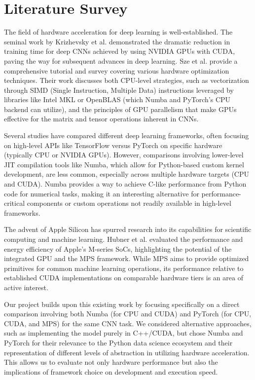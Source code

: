 \documentclass[conference]{IEEEtran} %
\begin{document}
\section{Literature Survey}
\label{sec:literature}
The field of hardware acceleration for deep learning is well-established. The seminal work by Krizhevsky et al. \cite{Krizhevsky2012} demonstrated the dramatic reduction in training time for deep CNNs achieved by using NVIDIA GPUs with CUDA, paving the way for subsequent advances in deep learning. Sze et al. \cite{Sze2017} provide a comprehensive tutorial and survey covering various hardware optimization techniques. Their work discusses both CPU-level strategies, such as vectorization through SIMD (Single Instruction, Multiple Data) instructions leveraged by libraries like Intel MKL or OpenBLAS (which Numba and PyTorch's CPU backend can utilize), and the principles of GPU parallelism that make GPUs effective for the matrix and tensor operations inherent in CNNs.

Several studies have compared different deep learning frameworks, often focusing on high-level APIs like TensorFlow versus PyTorch on specific hardware (typically CPU or NVIDIA GPUs). However, comparisons involving lower-level JIT compilation tools like Numba, which allow for Python-based custom kernel development, are less common, especially across multiple hardware targets (CPU and CUDA). Numba provides a way to achieve C-like performance from Python code for numerical tasks, making it an interesting alternative for performance-critical components or custom operations not readily available in high-level frameworks.

The advent of Apple Silicon has spurred research into its capabilities for scientific computing and machine learning. Hubner et al. \cite{Hubner2025} evaluated the performance and energy efficiency of Apple's M-series SoCs, highlighting the potential of the integrated GPU and the MPS framework. While MPS aims to provide optimized primitives for common machine learning operations, its performance relative to established CUDA implementations on comparable hardware tiers is an area of active interest.

Our project builds upon this existing work by focusing specifically on a direct comparison involving both Numba (for CPU and CUDA) and PyTorch (for CPU, CUDA, and MPS) for the same CNN task. We considered alternative approaches, such as implementing the model purely in C++/CUDA, but chose Numba and PyTorch for their relevance to the Python data science ecosystem and their representation of different levels of abstraction in utilizing hardware acceleration. This allows us to evaluate not only hardware performance but also the implications of framework choice on development and execution speed.
\end{document}
